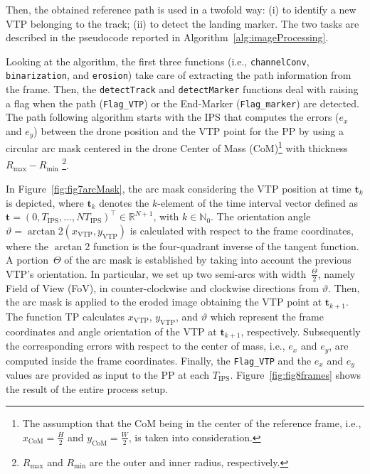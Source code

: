 \documentclass[a4paper,twocolumn,10pt]{article}
\begin{document}
    Then, the obtained reference path is used in a twofold way: (i) to identify a new VTP belonging to the track; (ii) to detect the landing marker. The two tasks are described in the 
    pseudocode reported in Algorithm~\ref{alg:imageProcessing}.

    Looking at the algorithm, the first three functions (i.e., \texttt{channelConv}, \texttt{binarization}, and \texttt{erosion}) take care of extracting the path information from the frame. Then, the \texttt{detectTrack} and \texttt{detectMarker} functions deal with raising a flag when the path (\texttt{Flag\_VTP}) or the End-Marker (\texttt{Flag\_marker}) are detected. The path following algorithm starts with the IPS that computes the errors ($e_x$ and $e_y$) between the drone position and the VTP point for the PP by using a circular arc mask centered in the 
    drone Center of Mass (CoM)\footnote{The assumption that the CoM being in the center of the reference 
    frame, i.e., $x_\mathrm{CoM} = \frac{H}{2}$ and $y_\mathrm{CoM}=\frac{W}{2}$, is taken into consideration.} with thickness $R_\mathrm{max} - R_\mathrm{min}$
    \footnote{$R_\mathrm{max}$ and $R_\mathrm{min}$ are the outer and inner radius, respectively.}. 

    In Figure~\ref{fig:fig7arcMask}, the arc mask considering the VTP position at time $\mathbf{t}_k$ 
    is depicted, where $\mathbf{t}_k$ denotes the $k$-element of the time interval vector defined as 
    $\mathbf{t} =(0, T_\mathrm{IPS}, \dots, NT_\mathrm{IPS})^\top \in \mathbb{R}^{N+1}$, with $k \in 
    \mathbb{N}_0$. The orientation angle \mbox{$\vartheta = \arctan$2$(x_\mathrm{VTP},y_\mathrm{VTP})$} 
    is calculated with respect to the frame coordinates, where the $\arctan$2 function is the 
    four-quadrant inverse of the tangent function. A portion~$\varTheta$ of the arc mask is established 
    by taking into account the previous VTP's orientation. In particular, we set up two semi-arcs 
    with width~$\frac{\varTheta}{2}$, namely Field of View (FoV), in counter-clockwise and clockwise 
    directions from $\vartheta$. Then, the arc mask is applied to the eroded image obtaining 
    the VTP point at $\mathbf{t}_{k+1}$. The function TP calculates $x_\mathrm{VTP}$, 
    $y_\mathrm{VTP}$, and $\vartheta$ which represent the frame coordinates and angle orientation of 
    the VTP at  $\mathbf{t}_{k+1}$, respectively. Subsequently the corresponding errors with 
    respect to the center of mass, i.e., $e_x$ and $e_y$, are computed inside the frame coordinates. 
    Finally, the \texttt{Flag\_VTP} and the $e_x$ and $e_y$ values are provided as input to the PP 
    at each $T_\mathrm{IPS}$. Figure~\ref{fig:fig8frames} shows the result of the entire process setup. 
\end{document}
